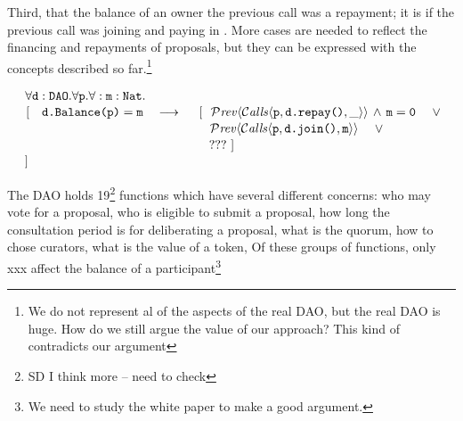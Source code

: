 \noindent
Third, that the balance of an owner  the previous call was
a repayment; it is  if  the previous call was  joining  and paying in . More cases are needed to reflect the financing and repayments of proposals, but they can be expressed with the concepts described so far.\footnote{We do not represent al of the
aspects of the real DAO, but the real DAO is huge.
How do we still argue the value of our approach? This kind of contradicts our argument}

\noindent
$\strut \hspace{0.5cm} \forall {\mbox{\tt{d}}}:{\mbox{\tt{DAO}}}.\forall {\mbox{\tt{p}}}.\forall:{\mbox{\tt{m}}}:{\mbox{\tt{Nat}}}.$\\
$\strut \hspace{0.5cm} [ \ \ \  \prg{d.Balance(p)}=\prg{m} \ \ \  \longrightarrow   
 \ \  \ \ 
  [ \  \ \Prev{\Calls{\prg{p},\prg{d.repay()},\_}}\, \wedge\, \prg{m}=\prg{0} \ \ \ \ \vee $\\
$\strut \hspace{5.7cm}      
\Prev{\Calls{\prg{p},\prg{d.join()},\prg{m}}}  \ \ \ \ \vee   $\\
 $\strut \hspace{5.7cm}  ??? \  ]$ \\
%                         
$\strut \hspace{0.5cm} ] $
  



 

\noindent

The DAO holds 19\footnote{SD I think more -- need to check} functions which have several different concerns:
who may vote   for a proposal, who is eligible to submit a proposal,
how long the consultation period is for deliberating a proposal, what
is the quorum, how to chose curators, what is the value of a token,
Of these groups of functions, only xxx affect the balance of a
participant\footnote{We need to study the white paper to make a good
argument.} 
 
